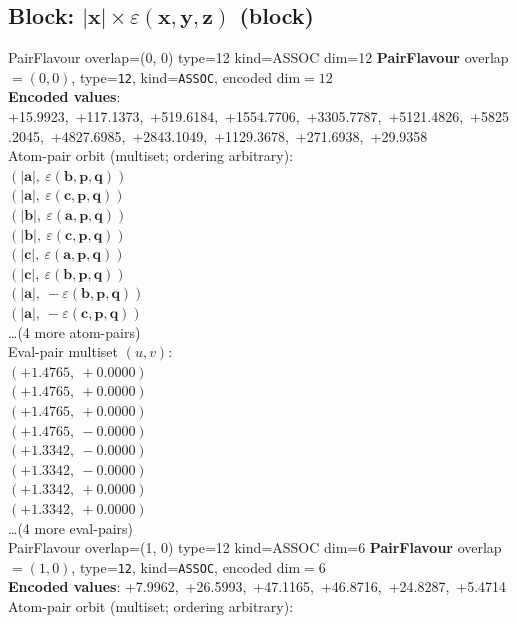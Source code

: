 \documentclass[a4paper,11pt]{article}
\newcommand{\vc}[1]{\ensuremath{\mathbf{#1}}}
\newcommand{\dnfagmiihhiejm}[1]{|\vc{#1}|}
\newcommand{\kblbmcpggoncpf}[3]{\varepsilon(\mathbf{#1},\mathbf{#2},\mathbf{#3})}
\begin{document}
\subsection{Block: $\dnfagmiihhiejm{x} \times \kblbmcpggoncpf{x}{y}{z}$  (block)}
    PairFlavour  overlap=(0, 0)  type=12  kind=ASSOC  dim=12
\textbf{PairFlavour} overlap$=(0, 0)$, type=\texttt{12}, kind=\texttt{ASSOC}, encoded dim$=12$\\
\textbf{      Encoded values}: +15.9923,\ +117.1373,\ +519.6184,\ +1554.7706,\ +3305.7787,\ +5121.4826,\ +5825.2045,\ +4827.6985,\ +2843.1049,\ +1129.3678,\ +271.6938,\ +29.9358\\
\quad Atom-pair orbit (multiset; ordering arbitrary):\\
$(\dnfagmiihhiejm{a},\ \kblbmcpggoncpf{b}{p}{q})$\\
$(\dnfagmiihhiejm{a},\ \kblbmcpggoncpf{c}{p}{q})$\\
$(\dnfagmiihhiejm{b},\ \kblbmcpggoncpf{a}{p}{q})$\\
$(\dnfagmiihhiejm{b},\ \kblbmcpggoncpf{c}{p}{q})$\\
$(\dnfagmiihhiejm{c},\ \kblbmcpggoncpf{a}{p}{q})$\\
$(\dnfagmiihhiejm{c},\ \kblbmcpggoncpf{b}{p}{q})$\\
$(\dnfagmiihhiejm{a},\ -\kblbmcpggoncpf{b}{p}{q})$\\
$(\dnfagmiihhiejm{a},\ -\kblbmcpggoncpf{c}{p}{q})$\\
\quad \ldots (4 more atom-pairs)\\
\quad Eval-pair multiset $(u, v)$:\\
$(+1.4765,\ +0.0000)$\\
$(+1.4765,\ +0.0000)$\\
$(+1.4765,\ +0.0000)$\\
$(+1.4765,\ -0.0000)$\\
$(+1.3342,\ -0.0000)$\\
$(+1.3342,\ -0.0000)$\\
$(+1.3342,\ +0.0000)$\\
$(+1.3342,\ +0.0000)$\\
\quad \ldots (4 more eval-pairs)\\
    PairFlavour  overlap=(1, 0)  type=12  kind=ASSOC  dim=6
\textbf{PairFlavour} overlap$=(1, 0)$, type=\texttt{12}, kind=\texttt{ASSOC}, encoded dim$=6$\\
\textbf{      Encoded values}: +7.9962,\ +26.5993,\ +47.1165,\ +46.8716,\ +24.8287,\ +5.4714\\
\quad Atom-pair orbit (multiset; ordering arbitrary):\\
\end{document}
